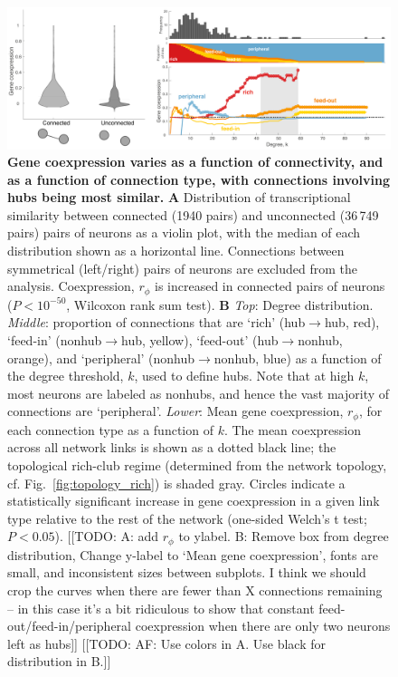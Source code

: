 \documentclass[10pt,letterpaper]{article}
\begin{document}
 \begin{figure}[h]
 \centering
    \includegraphics[width=1\textwidth]{MeanCoexpression.pdf}
 \caption{{\bf Gene coexpression varies as a function of connectivity, and as a function of connection type, with connections involving hubs being most similar.}
\textbf{A} Distribution of transcriptional similarity between connected (1940 pairs) and unconnected (36\,749 pairs) pairs of neurons as a violin plot, with the median of each distribution shown as a horizontal line. Connections between symmetrical (left/right) pairs of neurons are excluded from the analysis.
Coexpression, $r_\phi$ is increased in connected pairs of neurons ($P < 10^{-50}$, Wilcoxon rank sum test).
\textbf{B}
\emph{Top}: Degree distribution.
\emph{Middle}: proportion of connections that are `rich' (hub$\rightarrow$hub, red), `feed-in' (nonhub$\rightarrow$hub, yellow), `feed-out' (hub$\rightarrow$nonhub, orange), and `peripheral' (nonhub$\rightarrow$nonhub, blue) as a function of the degree threshold, $k$, used to define hubs.
Note that at high $k$, most neurons are labeled as nonhubs, and hence the vast majority of connections are `peripheral'.
\emph{Lower}: Mean gene coexpression, $r_\phi$, for each connection type as a function of $k$.
The mean coexpression across all network links is shown as a dotted black line; the topological rich-club regime (determined from the network topology, cf. Fig.~\ref{fig:topology_rich}) is shaded gray.
Circles indicate a statistically significant increase in gene coexpression in a given link type relative to the rest of the network (one-sided Welch’s t test; $P < 0.05$).
[[TODO: A: add $r_\phi$ to ylabel.
B: Remove box from degree distribution, Change y-label to `Mean gene coexpression', fonts are small, and inconsistent sizes between subplots.
I think we should crop the curves when there are fewer than X connections remaining -- in this case it's a bit ridiculous to show that constant feed-out/feed-in/peripheral coexpression when there are only two neurons
left as hubs]]
[[TODO: AF: Use colors in A. Use black for distribution in B.]]
}
 \label{fig:coExp}
\end{figure}
\end{document}
